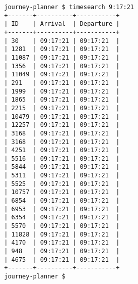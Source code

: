 \documentclass[12pt]{report}
\begin{document}
	\begin{verbatim}
		journey-planner $ timesearch 9:17:21
		+-------+----------+-----------+
		| ID    | Arrival  | Departure |
		+-------+----------+-----------+
		| 30    | 09:17:21 | 09:17:21  |
		| 1281  | 09:17:21 | 09:17:21  |
		| 11087 | 09:17:21 | 09:17:21  |
		| 1356  | 09:17:21 | 09:17:21  |
		| 11049 | 09:17:21 | 09:17:21  |
		| 291   | 09:17:21 | 09:17:21  |
		| 1999  | 09:17:21 | 09:17:21  |
		| 1865  | 09:17:21 | 09:17:21  |
		| 2215  | 09:17:21 | 09:17:21  |
		| 10479 | 09:17:21 | 09:17:21  |
		| 12257 | 09:17:21 | 09:17:21  |
		| 3168  | 09:17:21 | 09:17:21  |
		| 3168  | 09:17:21 | 09:17:21  |
		| 4251  | 09:17:21 | 09:17:21  |
		| 5516  | 09:17:21 | 09:17:21  |
		| 5844  | 09:17:21 | 09:17:21  |
		| 5311  | 09:17:21 | 09:17:21  |
		| 5525  | 09:17:21 | 09:17:21  |
		| 10757 | 09:17:21 | 09:17:21  |
		| 6854  | 09:17:21 | 09:17:21  |
		| 6953  | 09:17:21 | 09:17:21  |
		| 6354  | 09:17:21 | 09:17:21  |
		| 5570  | 09:17:21 | 09:17:21  |
		| 11828 | 09:17:21 | 09:17:21  |
		| 4170  | 09:17:21 | 09:17:21  |
		| 948   | 09:17:21 | 09:17:21  |
		| 4675  | 09:17:21 | 09:17:21  |
		+-------+----------+-----------+
		journey-planner $ 
	\end{verbatim}
	
		
\end{document}
